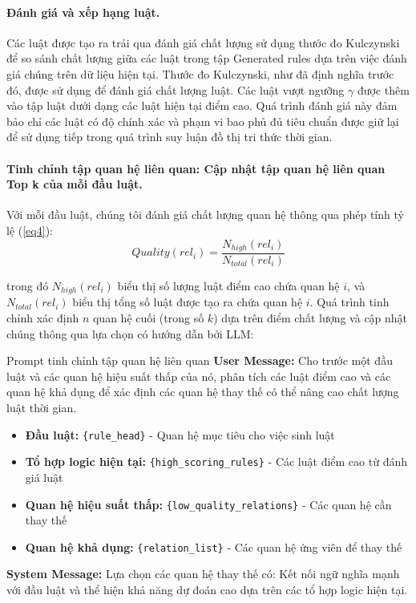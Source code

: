 \paragraph{Đánh giá và xếp hạng luật.}
Các luật được tạo ra trải qua đánh giá chất lượng sử dụng thước đo Kulczynski để so sánh chất lượng giữa các luật trong tập Generated rules dựa trên việc đánh giá chúng trên dữ liệu hiện tại. Thước đo Kulczynski, như đã định nghĩa trước đó, được sử dụng để đánh giá chất lượng luật. Các luật vượt ngưỡng $\gamma$ được thêm vào tập luật dưới dạng các luật hiện tại điểm cao. Quá trình đánh giá này đảm bảo chỉ các luật có độ chính xác và phạm vi bao phủ đủ tiêu chuẩn được giữ lại để sử dụng tiếp trong quá trình suy luận đồ thị tri thức thời gian.

\paragraph{Tinh chỉnh tập quan hệ liên quan: Cập nhật tập quan hệ liên quan Top k của mỗi đầu luật.}
Với mỗi đầu luật, chúng tôi đánh giá chất lượng quan hệ thông qua phép tính tỷ lệ (\ref{eq4}):
\begin{equation}
    \label{eq4}
    Quality(rel_i) = \frac{N_{high}(rel_i)}{N_{total}(rel_i)}
\end{equation}

trong đó $N_{high}(rel_i)$ biểu thị số lượng luật điểm cao chứa quan hệ $i$, và $N_{total}(rel_i)$ biểu thị tổng số luật được tạo ra chứa quan hệ $i$. Quá trình tinh chỉnh xác định $n$ quan hệ cuối (trong số $k$) dựa trên điểm chất lượng và cập nhật chúng thông qua lựa chọn có hướng dẫn bởi LLM:

\begin{promptbox}{Prompt tinh chỉnh tập quan hệ liên quan}
\textbf{User Message:}
Cho trước một đầu luật và các quan hệ hiệu suất thấp của nó, phân tích các luật điểm cao và các quan hệ khả dụng để xác định các quan hệ thay thế có thể nâng cao chất lượng luật thời gian.
\begin{itemize}
    \item \textbf{Đầu luật:} \texttt{\{rule\_head\}} - Quan hệ mục tiêu cho việc sinh luật
    \item \textbf{Tổ hợp logic hiện tại:} \texttt{\{high\_scoring\_rules\}} - Các luật điểm cao từ đánh giá luật
    \item \textbf{Quan hệ hiệu suất thấp:} \texttt{\{low\_quality\_relations\}} - Các quan hệ cần thay thế
    \item \textbf{Quan hệ khả dụng:} \texttt{\{relation\_list\}} - Các quan hệ ứng viên để thay thế
\end{itemize}

\textbf{System Message:} Lựa chọn các quan hệ thay thế có: Kết nối ngữ nghĩa mạnh với đầu luật và thể hiện khả năng dự đoán cao dựa trên các tổ hợp logic hiện tại.
\end{promptbox}

